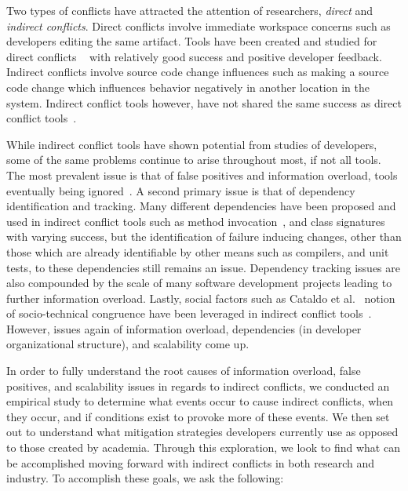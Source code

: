 \documentclass[conference]{IEEEtran}
\begin{document}
Two types of conflicts have attracted the attention of researchers, \textit{direct} and 
\textit{indirect conflicts}. Direct conflicts involve immediate workspace concerns such as developers editing the same
artifact. Tools have been created and studied for direct conflicts
~\cite{Xiang:2008:ERT, Biehl:2007:FVD, Sarma:2009:TIV, Khurana:2009:PFC} with relatively good success and 
positive developer feedback. Indirect conflicts involve source code change influences such as making a source code change 
which influences behavior negatively in another location in the system. Indirect conflict tools however, have
not shared the same success as direct conflict 
tools~\cite{Sarma:2007:TSA, Holmes:2010:CAR, Trainer:2005:BGT, Servant:2010:CPI, Borici:2012:CHA}.

While indirect conflict tools have shown potential from studies of developers, some of the same problems continue
to arise throughout most, if not all tools. The most prevalent issue is that of false positives and information
overload, tools eventually being
ignored~\cite{Sarma:2007:TSA, Servant:2010:CPI}. A second primary issue is that of dependency identification and
tracking. Many different dependencies have been proposed and used in indirect conflict tools such as method 
invocation~\cite{Trainer:2005:BGT}, and class signatures~\cite{Sarma:2007:TSA} with varying success, but the 
identification of failure inducing changes, other than those which are already identifiable by other means such
as compilers, and unit tests, to these dependencies still remains an issue. Dependency tracking issues are
also compounded by the scale of many software development projects leading to further information overload.
Lastly, social factors such as Cataldo et al.~\cite{Cataldo:2006:ICR} notion of socio-technical
congruence have been leveraged in indirect conflict tools~\cite{Kwan:2011:ESC, Begel:2010:CDE, Borici:2012:CHA}.
However, issues again of information overload, dependencies (in developer organizational structure), and scalability 
come up.

In order to fully understand the root causes of information overload, false positives, and
scalability issues in regards to indirect conflicts, we conducted an empirical study to determine what events occur to
cause indirect conflicts, when they occur, and if conditions exist to provoke more of these events. 
We then set out to understand what mitigation strategies developers currently use as opposed to those created
by academia. Through this exploration, we look to find what can be accomplished moving forward with indirect conflicts
in both research and industry. To accomplish these goals, we ask the following: 
\end{document}
